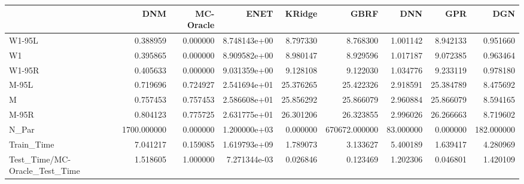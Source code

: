 \begin{tabular}{lrrrrrrrr}
\toprule
{} &          DNM &  MC-Oracle &          ENET &     KRidge &           GBRF &        DNN &        GPR &         DGN \\
\midrule
W1-95L                        &     0.388959 &   0.000000 &  8.748143e+00 &   8.797330 &       8.768300 &   1.001142 &   8.942133 &    0.951660 \\
W1                            &     0.395865 &   0.000000 &  8.909582e+00 &   8.980147 &       8.929596 &   1.017187 &   9.072385 &    0.963464 \\
W1-95R                        &     0.405633 &   0.000000 &  9.031359e+00 &   9.128108 &       9.122030 &   1.034776 &   9.233119 &    0.978180 \\
M-95L                         &     0.719696 &   0.724927 &  2.541694e+01 &  25.376265 &      25.422326 &   2.918591 &  25.384789 &    8.475692 \\
M                             &     0.757453 &   0.757453 &  2.586608e+01 &  25.856292 &      25.866079 &   2.960884 &  25.866079 &    8.594165 \\
M-95R                         &     0.804123 &   0.775725 &  2.631775e+01 &  26.301206 &      26.323855 &   2.996026 &  26.266663 &    8.719602 \\
N\_Par                         &  1700.000000 &   0.000000 &  1.200000e+03 &   0.000000 &  670672.000000 &  83.000000 &   0.000000 &  182.000000 \\
Train\_Time                    &     7.041217 &   0.159085 &  1.619793e+09 &   1.789073 &       3.133627 &   5.400189 &   1.639417 &    4.280969 \\
Test\_Time/MC-Oracle\_Test\_Time &     1.518605 &   1.000000 &  7.271344e-03 &   0.026846 &       0.123469 &   1.202306 &   0.046801 &    1.420109 \\
\bottomrule
\end{tabular}
